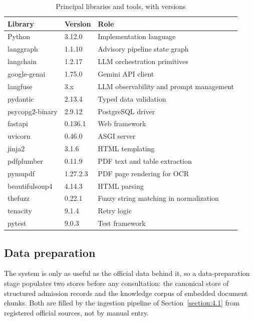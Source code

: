 \documentclass[../main.tex]{subfiles}
\begin{document}
\begin{table}[H]
    \centering
    \caption{Principal libraries and tools, with versions}
    \label{table:libraries}
    \begin{tabular}{|p{3.6cm}|p{2.2cm}|p{7.5cm}|}
        \hline
        \textbf{Library} & \textbf{Version} & \textbf{Role} \\
        \hline
        Python & 3.12.0 & Implementation language \\
        \hline
        langgraph & 1.1.10 & Advisory pipeline state graph \\
        \hline
        langchain~\cite{langchain} & 1.2.17 & \gls{LLM} orchestration primitives \\
        \hline
        google-genai & 1.75.0 & Gemini \gls{API} client \\
        \hline
        langfuse~\cite{langfuse} & 3.x & \gls{LLM} observability and prompt management \\
        \hline
        pydantic & 2.13.4 & Typed data validation \\
        \hline
        psycopg2-binary & 2.9.12 & PostgreSQL driver \\
        \hline
        fastapi & 0.136.1 & Web framework \\
        \hline
        uvicorn & 0.46.0 & \gls{ASGI} server \\
        \hline
        jinja2 & 3.1.6 & \gls{HTML} templating \\
        \hline
        pdfplumber & 0.11.9 & \gls{PDF} text and table extraction \\
        \hline
        pymupdf & 1.27.2.3 & \gls{PDF} page rendering for \gls{OCR} \\
        \hline
        beautifulsoup4 & 4.14.3 & \gls{HTML} parsing \\
        \hline
        thefuzz & 0.22.1 & Fuzzy string matching in normalization \\
        \hline
        tenacity & 9.1.4 & Retry logic \\
        \hline
        pytest & 9.0.3 & Test framework \\
        \hline
    \end{tabular}
\end{table}

\subsection{Data preparation}

The system is only as useful as the official data behind it, so a data-preparation stage populates two stores before any consultation: the canonical store of structured admission records and the knowledge corpus of embedded document chunks.
Both are filled by the ingestion pipeline of Section~\ref{section:4.1} from registered official sources, not by manual entry.
\end{document}
